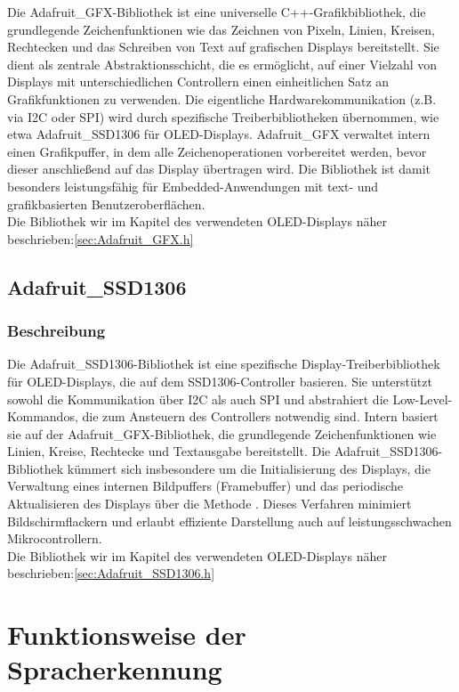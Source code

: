 Die Adafruit\_GFX-Bibliothek ist eine universelle C++-Grafikbibliothek, die grundlegende Zeichenfunktionen wie das Zeichnen von Pixeln, Linien, Kreisen, Rechtecken und das Schreiben von Text auf grafischen Displays bereitstellt. Sie dient als zentrale Abstraktionsschicht, die es ermöglicht, auf einer Vielzahl von Displays mit unterschiedlichen Controllern einen einheitlichen Satz an Grafikfunktionen zu verwenden. Die eigentliche Hardwarekommunikation (z.B. via I2C oder SPI) wird durch spezifische Treiberbibliotheken übernommen, wie etwa Adafruit\_SSD1306 für OLED-Displays. Adafruit\_GFX verwaltet intern einen Grafikpuffer, in dem alle Zeichenoperationen vorbereitet werden, bevor dieser anschließend auf das Display übertragen wird. Die Bibliothek ist damit besonders leistungsfähig für Embedded-Anwendungen mit text- und grafikbasierten Benutzeroberflächen.\\
\bigskip
Die Bibliothek wir im Kapitel des verwendeten OLED-Displays näher beschrieben:\ref{sec:Adafruit_GFX.h}


\subsection{Adafruit\_SSD1306}

\subsubsection{Beschreibung}

Die Adafruit\_SSD1306-Bibliothek ist eine spezifische Display-Treiberbibliothek für OLED-Displays, die auf dem SSD1306-Controller basieren. Sie unterstützt sowohl die Kommunikation über I2C als auch SPI und abstrahiert die Low-Level-Kommandos, die zum Ansteuern des Controllers notwendig sind. Intern basiert sie auf der Adafruit\_GFX-Bibliothek, die grundlegende Zeichenfunktionen wie Linien, Kreise, Rechtecke und Textausgabe bereitstellt. Die Adafruit\_SSD1306-Bibliothek kümmert sich insbesondere um die Initialisierung des Displays, die Verwaltung eines internen Bildpuffers (Framebuffer) und das periodische Aktualisieren des Displays über die Methode . Dieses Verfahren minimiert Bildschirmflackern und erlaubt effiziente Darstellung auch auf leistungsschwachen Mikrocontrollern.\\
\bigskip
Die Bibliothek wir im Kapitel des verwendeten OLED-Displays näher beschrieben:\ref{sec:Adafruit_SSD1306.h}


\section{Funktionsweise der Spracherkennung}

